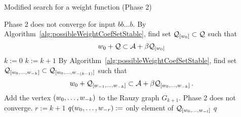 \begin{algorithm}
  \caption{Modified search for a weight function (Phase 2)}
    \label{alg:weightFunction_modified}
  \begin{algorithmic}[1]
    		\RETURN Phase 2 does not converge for input $bb\dots b$.
    	\ENDIF
    \ENDFOR
        \STATE By Algorithm~\ref{alg:possibleWeightCoefSetStable}, find set $\mathcal{Q}_{[w_0]} \subset \mathcal{Q}$ such that
          $$
          w_0 + \mathcal{Q} \subset \mathcal{A} + \beta \mathcal{Q}_{[w_0]}
          $$\vspace{-20pt}
    \ENDFOR
    \STATE $k:=0$
        \STATE $k:= k +1$
            \STATE By Algorithm~\ref{alg:possibleWeightCoefSetStable}, find set $\mathcal{Q}_{[w_{0}, \dots, w_{-k}]} \subset \mathcal{Q}_{[w_{0}, \dots, w_{-(k-1)}]}$ such that
              $$
              w_0 + \mathcal{Q}_{[w_{-1}, \dots, w_{-k}]} \subset \mathcal{A} + \beta \mathcal{Q}_{[w_{0}, \dots, w_{-k}]}\,.
              $$\vspace{-20pt}
              	\STATE Add the vertex $(w_{0}, \dots, w_{-k})$ to the Rauzy graph $G_{k+1}$.
              		\RETURN Phase 2 does not converge.
              	\ENDIF
              \ENDIF
        \ENDFOR  
    \ENDWHILE  
    \STATE $r:= k+1$
	    		\STATE $q(w_{0}, \dots, w_{-r}):=$ only element of $\mathcal{Q}_{[w_{0}, \dots, w_{-l}]}$
	    	\ENDFOR
	    \ENDFOR
	\ENDFOR
    \RETURN $q$
  \end{algorithmic}
\end{algorithm}





